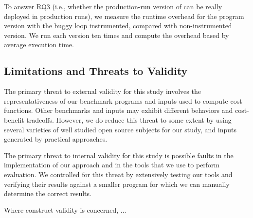 To answer RQ3 (i.e., whether the production-run version of \Tool 
can be really deployed in production runs), 
we measure the runtime overhead for the program version 
with the buggy loop instrumented, compared with non-instrumented version. 
We run each version ten times and compute the overhead based by average execution time. 


\subsection{Limitations and Threats to Validity}


The primary threat to external validity 
for this study involves the representativeness 
of our benchmark programs and inputs used
to compute cost functions.
Other benchmarks and inputs may exhibit different 
behaviors and cost-benefit tradeoffs.
However, we do reduce this threat to some extent by
using several varieties of well studied open source subjects 
for our study, and inputs generated by practical approaches.

The primary threat to internal validity for this study
is possible faults in the implementation of our approach
and in the tools that we use to perform evaluation.
We controlled for this threat by extensively testing
our tools and verifying their results against a smaller
program for which we can manually determine the correct results.

Where construct validity is concerned, ...

